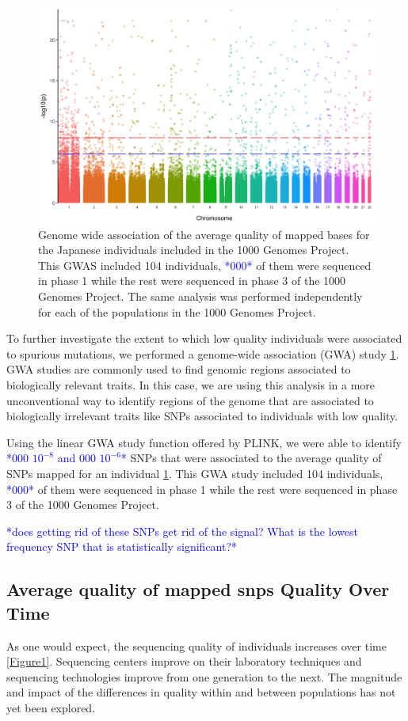 \documentclass[12pt,twocolumn]{article}
\newcommand{\todo}[1]{\textcolor{blue}{*#1*}}
\begin{document}
\begin{figure}
\includegraphics[width=\hsize,keepaspectratio]{GWAS_Qual_GenomeWide_JPT.jpg}
\caption{Genome wide association of the average quality of mapped bases for the Japanese individuals included in the 1000 Genomes Project. This GWAS included 104 individuals, \todo{000} of them were sequenced in phase 1 while the rest were sequenced in phase 3 of the 1000 Genomes Project. The same analysis was performed independently for each of the populations in the 1000 Genomes Project. }
 \label{Figure2}
\end{figure}

To further investigate	 the extent to which low quality individuals were associated to spurious mutations, we performed a genome-wide association (GWA) study  \ref{Figure2}. GWA studies are commonly used to find genomic regions associated to biologically relevant traits. In this case, we are using this analysis in a more unconventional way to identify regions of the genome that are associated to biologically irrelevant traits like SNPs associated to individuals with low quality.
 
Using the linear GWA study function offered by PLINK, we were able to identify \todo{000 $10^{-8}$ and 000 $10^{-6}$} SNPs that were associated to the average quality of SNPs mapped for an individual \ref{Figure2}.  This GWA study included 104 individuals, \todo{000} of them were sequenced in phase 1 while the rest were sequenced in phase 3 of the 1000 Genomes Project.

\todo{does getting rid of these SNPs get rid of the signal? What is the lowest frequency SNP that is statistically significant?}

	\subsection{Average quality of mapped snps Quality Over Time}
As one would expect, the sequencing quality of individuals increases over time \ref{Figure1}. Sequencing centers improve on their laboratory techniques and sequencing technologies improve from one generation to the next. The magnitude and impact of the differences in quality within and between populations has not yet been explored. 
\end{document}
